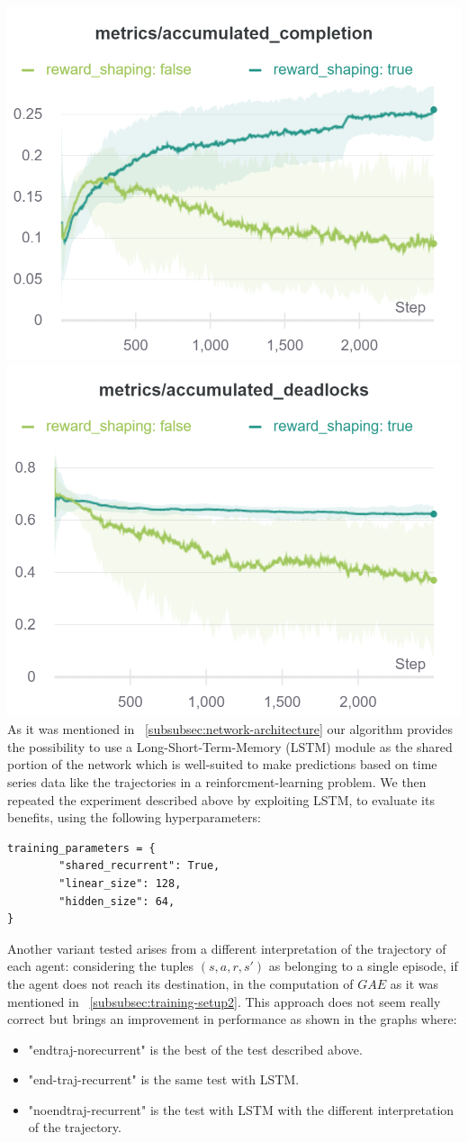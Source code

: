 \documentclass[11pt, a4paper, hidelinks]{report}
\begin{document}
\includegraphics[width=0.33\linewidth]{resources/charts_psppo_1/accumulated_completion}
\includegraphics[width=0.33\linewidth]{resources/charts_psppo_1/accumulated_deadlocks}
As it was mentioned in ~\ref{subsubsec:network-architecture} our algorithm provides the possibility to use a Long-Short-Term-Memory (LSTM) module as the shared portion of the network which is well-suited to make predictions based on time series data like the trajectories in a reinforcment-learning problem.
We then repeated the experiment described above by exploiting LSTM, to evaluate its benefits, using the following hyperparameters: 
\begin{lstlisting}[label={lst:psppo-net-init}]
training_parameters = {
        "shared_recurrent": True,
        "linear_size": 128,
        "hidden_size": 64,
}
\end{lstlisting}
Another variant tested arises from a different interpretation of the trajectory of each agent: considering the tuples $(s, a, r, s')$ as belonging to a single episode, if the agent does not reach its destination, in the computation of $GAE$ as it was mentioned in ~\ref{subsubsec:training-setup2}. 
This approach does not seem really correct but brings an improvement in performance as shown in the graphs where:
\begin{itemize}
\item "endtraj-norecurrent" is the best of the test described above.
\item "end-traj-recurrent" is the same test with LSTM.
\item "noendtraj-recurrent" is the test with LSTM with the different interpretation of the trajectory. 
\end{itemize}
\end{document}
